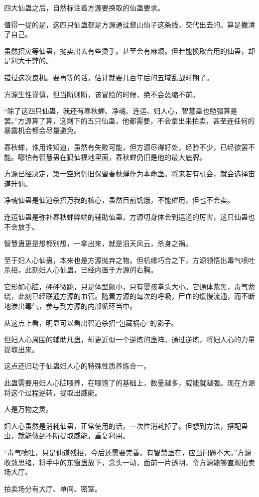 \begin{this_body}
四大仙蛊之后，自然标注着方源要换取的仙蛊要求。

值得一提的是，这四只仙蛊都是方源通过黎山仙子这条线，交代出去的。算是撇清了自己。

虽然招灾等仙蛊，抛卖出去有些烫手。甚至会有麻烦。但若能换取合用的仙蛊，却是利大于弊的。

错过这次良机。要再等的话，估计就要几百年后的五域乱战时期了。

方源生性谨慎，但当断则断，该冒险的时候，绝不会怂缩不前。

“除了这四只仙蛊，我还有春秋蝉、净魂、连运、妇人心，智慧蛊也勉强算是罢。”方源算了算，这剩下的五只仙蛊，他都需要，不会拿出来拍卖，甚至连任何的暴露机会都会尽量避免。

春秋蝉，谁用谁知道，虽然有失败可能，但方源尽得好处，经验不少，已经欲罢不能。哪怕有智慧蛊在狐仙福地里面，春秋蝉仍旧是他的最大底牌。

方源已经决定，第一空窍仍旧保留春秋蝉作为本命蛊。将来若有机会，就会选择宙道升仙。

净魂仙蛊是仙道杀招万我的核心，虽然目前饥饿，不能催用，但也不会卖。

连运仙蛊是弥补春秋蝉弊端的辅助仙蛊，方源切身体会到运道的厉害，这只仙蛊也不会放手。

智慧蛊更是想都别想，一拿出来，就是滔天风云，杀身之祸。

至于妇人心仙蛊，本来也是方源抛弃之物。但机缘巧合之下，方源领悟出毒气喷吐杀招，此刻妇人心仙蛊，已经内置于方源的右胸。

它形如心脏，砰砰微跳，只是体型颇小，只有婴孩拳头大小。它通体紫黑，毒气萦绕，此刻已经联通方源的血管。随着方源的每次的呼吸，尸血的缓慢流通，而不断地渗出毒气，参与到方源的内部循环当中。

从这点上看，明显可以看出智道杀招“包藏祸心”的影子。

但妇人心周围的辅助凡蛊，却更近似一个逆炼的蛊阵。通过逆炼，将妇人心的力量提取出来。

这点还归功于仙蛊妇人心的特殊性质养炼合一。

此蛊需要用妇人心脏喂养，在喂饱了的基础上，数量越多，威能就越强。现在方源将这个过程逆转，提取出威能。

人是万物之灵。

妇人心虽然是消耗仙蛊，正常使用的话，一次性消耗掉了。但想到方法，搭配蛊虫，就能做到不断提取威能，重复利用。

“毒气喷吐，只是仙道残招，今后还需要完善。有智慧蛊在，应当问题不大。”方源收敛思绪，将手中的东窗蛊放下，念头一动，面前一片透明，令方源能够直观拍卖场大厅。

拍卖场分有大厅、单间、密室。


\end{this_body}
